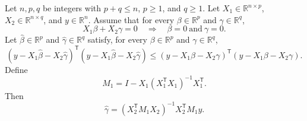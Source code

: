 \begin{theorem}
Let $n,p,q$ be integers with $p+q\leq n$, $p\geq1$, and $q\geq1$.
Let $X_1\in\mathbb R^{n\times p}$, $X_2\in\mathbb R^{n\times q}$, and
$y\in\mathbb R^n$.  Assume that for every
$\beta\in\mathbb R^p$ and $\gamma\in\mathbb R^q$,
\[
  X_1\beta+X_2\gamma=0
  \quad\Longrightarrow\quad
  \beta=0\ \text{and}\ \gamma=0.
\]
Let $\widehat\beta\in\mathbb R^p$ and
$\widehat\gamma\in\mathbb R^q$ satisfy, for every
$\beta\in\mathbb R^p$ and $\gamma\in\mathbb R^q$,
\[
  (y-X_1\widehat\beta-X_2\widehat\gamma)^{\mathsf T}
  (y-X_1\widehat\beta-X_2\widehat\gamma)
  \leq
  (y-X_1\beta-X_2\gamma)^{\mathsf T}
  (y-X_1\beta-X_2\gamma).
\]
Define
\[
  M_1=I-X_1(X_1^{\mathsf T}X_1)^{-1}X_1^{\mathsf T}.
\]
Then
\[
  \widehat\gamma
  =(X_2^{\mathsf T}M_1X_2)^{-1}X_2^{\mathsf T}M_1y.
\]
\end{theorem}
